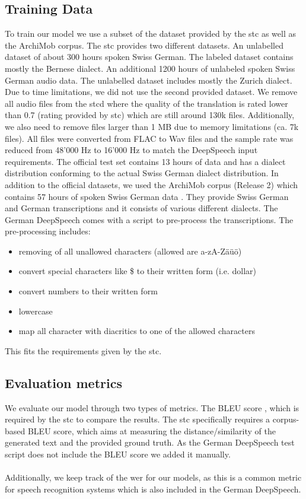 \subsection{Training Data}
To train our model we use a subset of the dataset provided by the \gls{stc} as well as the ArchiMob corpus. The \gls{stc} provides two different datasets. An unlabelled dataset of about 300 hours spoken Swiss German. The labeled dataset contains mostly the Bernese dialect. An additional 1200 hours of unlabeled spoken Swiss German audio data. The unlabelled dataset includes mostly the Zurich dialect. Due to time limitations, we did not use the second provided dataset. We remove all audio files from the \gls{stcd} where the quality of the translation is rated lower than 0.7 (rating provided by \gls{stc}) which are still around 130k files. Additionally, we also need to remove files larger than 1 MB due to memory limitations (ca. 7k files). All files were converted from FLAC to Wav files and the sample rate was reduced from 48'000 Hz to 16'000 Hz to match the DeepSpeech input requirements. The official test set contains 13 hours of data \cite{stc2019} and has a dialect distribution conforming to the actual Swiss German dialect distribution. In addition to the official datasets, we used the ArchiMob corpus (Release 2) which contains 57 hours of spoken Swiss German data \cite{archimob2016}. They provide Swiss German and German transcriptions and it consists of various different dialects.
The German DeepSpeech comes with a script to pre-process the transcriptions. The pre-processing includes:
\begin{itemize}
\item removing of all unallowed characters (allowed are a-zA-Zäüö)
\item convert special characters like \$ to their written form (i.e. dollar)
\item convert numbers to their written form
\item lowercase
\item map all character with diacritics to one of the allowed characters
\end{itemize}

This fits the requirements given by the \gls{stc}.

\subsection{Evaluation metrics}
We evaluate our model through two types of metrics. The BLEU score \cite{Papineni2002BleuAM}, which is required by the \gls{stc} to compare the results. The \gls{stc} specifically requires a corpus-based BLEU score, which aims at measuring the distance/similarity of the generated text and the provided ground truth. As the German DeepSpeech test script does not include the BLEU score we added it manually. \\~\\Additionally, we keep track of the \gls{wer} for our models, as
this is a common metric for speech recognition systems \cite{Park2008AnEA} which is also included in the German DeepSpeech.


